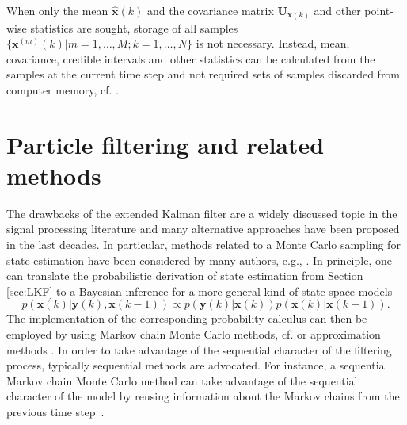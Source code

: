 \documentclass[10pt]{article}
\begin{document}
\begin{spacing}{1}
When only the mean $\hat{\bm{x}}(k)$ and the covariance matrix $\bm{U}_{\bm{x}(k)}$ and other point-wise statistics are sought, storage of all samples $\{ \bm{x}^{(m)}(k) | m=1,\ldots,M; k=1,\ldots,N \}$ is not necessary. Instead, mean, covariance, credible intervals and other statistics can be calculated from the samples at the current time step and not required sets of samples discarded from computer memory, cf. \cite{Eichstadt2012}.



\section{Particle filtering and related methods}
\label{sec:Particle}
The drawbacks of the extended Kalman filter are a widely discussed topic in the signal processing literature and many alternative approaches have been proposed in the last decades. In particular, methods related to a Monte Carlo sampling for state estimation have been considered by many authors, e.g., \cite{Garcia:2013kq, Douc:2005, Wang:2007ik, Montazeri:2010il}.
In principle, one can translate the probabilistic derivation of state estimation from Section \ref{sec:LKF} to a Bayesian inference for a more general kind of state-space models~\cite{Candy}
\begin{equation}
	p(\bm{x}(k) \vert \bm{y}(k), \bm{x}(k-1)) \propto p(\bm{y}(k) \vert \bm{x}(k)) p(\bm{x}(k) \vert \bm{x}(k-1)) .
\end{equation}
The implementation of the corresponding probability calculus can then be employed by using Markov chain Monte Carlo methods, cf. \cite{Klauenberg:2016dw, Hoffman:2011} or approximation methods \cite{Jiang:2010wg}. In order to take advantage of the sequential character of the filtering process, typically sequential methods are advocated.
For instance, a sequential Markov chain Monte Carlo method can take advantage of the sequential character of the model by reusing information about the Markov chains from the previous time step~\cite{Yang2013}.


\end{spacing}
\end{document}
